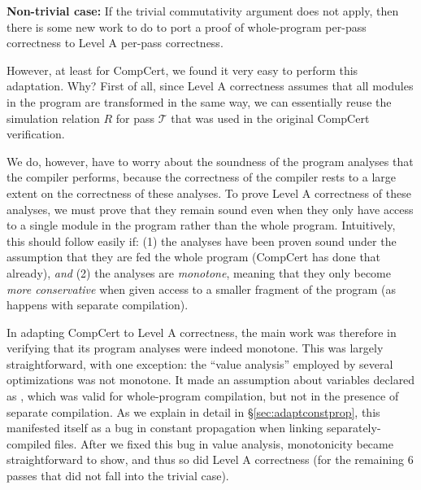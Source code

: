 \textbf{Non-trivial case:} If the trivial commutativity argument does
not apply, then there is some new work to do to port a proof of
whole-program per-pass correctness to Level A per-pass correctness.

However, at least for CompCert, we found it very easy to perform this
adaptation.  Why?  First of all, since Level A correctness assumes
that all modules in the program are transformed in the same way, we
can essentially reuse the simulation relation $R$ for pass
$\mathcal{T}$ that was used in the original CompCert verification.

We do, however, have to worry about the soundness of the program
analyses that the compiler performs, because the correctness of the
compiler rests to a large extent on the correctness of these analyses.
To prove Level A correctness of these analyses, we must prove that
they remain sound even when they only have access to a single module
in the program rather than the whole program.  Intuitively, this
should follow easily if: (1) the analyses have been proven sound under
the assumption that they are fed the whole program (CompCert has done
that already), \emph{and} (2) the analyses are \emph{monotone},
meaning that they only become \emph{more conservative} when given
access to a smaller fragment of the program (as happens with separate
compilation).

In adapting CompCert to Level A correctness, the main work was
therefore in verifying that its program analyses were indeed monotone.
This was largely straightforward, with one exception: the ``value
analysis'' employed by several optimizations was not monotone.  It
made an assumption about variables declared as ,
which was valid for whole-program compilation, but not in the presence
of separate compilation.  As we explain in detail in
\S\ref{sec:adaptconstprop}, this manifested itself as a bug in
constant propagation when linking separately-compiled files.  After we
fixed this bug in value analysis, monotonicity became straightforward
to show, and thus so did Level A correctness (for the remaining 6
passes that did not fall into the trivial case).











